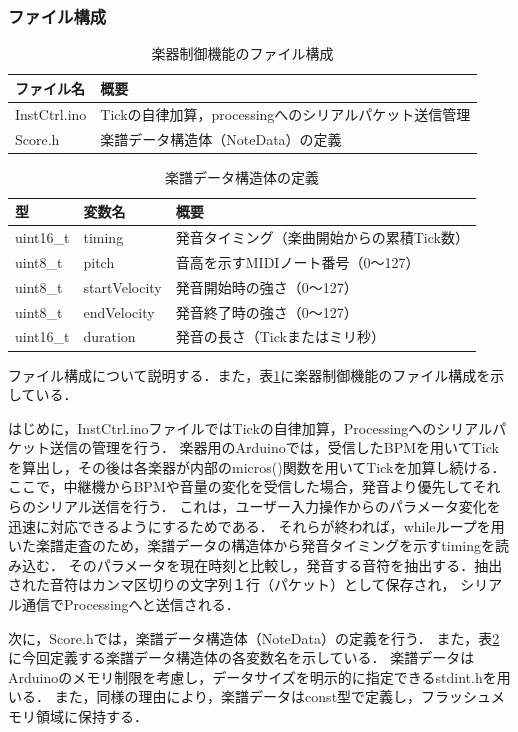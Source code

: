 \documentclass[lualatex,book,paper=a4paper,jafontsize=11.5pt,jafontscale=1.05]{jlreq}
\begin{document}
\subsubsection{ファイル構成}
\begin{table}[bt]
    \vspace{-1em}
    \caption{楽器制御機能のファイル構成}
    \centering
    \label{tab:file2}
    \begin{tabular}{ll}
    \hline
    \textbf{ファイル名} & \textbf{概要}\\
    \hline
    InstCtrl.ino & Tickの自律加算，processingへのシリアルパケット送信管理\\
    \hline
    Score.h & 楽譜データ構造体（NoteData）の定義\\
    \hline
    \end{tabular}
\end{table}

\begin{table}[bt]
    \vspace{-1em}
    \caption{楽譜データ構造体の定義}
    \centering
    \label{tab:deta}
    \begin{tabular}{lll}
    \hline
    \textbf{型} & \textbf{変数名} & \textbf{概要} \\
    \hline
    uint16\_t & timing & 発音タイミング（楽曲開始からの累積Tick数） \\
    \hline
    uint8\_t & pitch & 音高を示すMIDIノート番号（0〜127） \\
    \hline
    uint8\_t & startVelocity & 発音開始時の強さ（0〜127） \\
    \hline
    uint8\_t & endVelocity & 発音終了時の強さ（0〜127） \\
    \hline
    uint16\_t & duration & 発音の長さ（Tickまたはミリ秒） \\
    \hline
    \end{tabular}
\end{table}

ファイル構成について説明する．また，表\ref{tab:file2}に楽器制御機能のファイル構成を示している．\par
はじめに，InstCtrl.inoファイルではTickの自律加算，Processingへのシリアルパケット送信の管理を行う．
楽器用のArduinoでは，受信したBPMを用いてTickを算出し，その後は各楽器が内部のmicros()関数を用いてTickを加算し続ける．
ここで，中継機からBPMや音量の変化を受信した場合，発音より優先してそれらのシリアル送信を行う．
これは，ユーザー入力操作からのパラメータ変化を迅速に対応できるようにするためである．
それらが終われば，whileループを用いた楽譜走査のため，楽譜データの構造体から発音タイミングを示すtimingを読み込む．
そのパラメータを現在時刻と比較し，発音する音符を抽出する．抽出された音符はカンマ区切りの文字列１行（パケット）として保存され，
シリアル通信でProcessingへと送信される．\par
次に，Score.hでは，楽譜データ構造体（NoteData）の定義を行う．
また，表\ref{tab:deta}に今回定義する楽譜データ構造体の各変数名を示している．
楽譜データはArduinoのメモリ制限を考慮し，データサイズを明示的に指定できるstdint.hを用いる．
また，同様の理由により，楽譜データはconst型で定義し，フラッシュメモリ領域に保持する．
\end{document}

